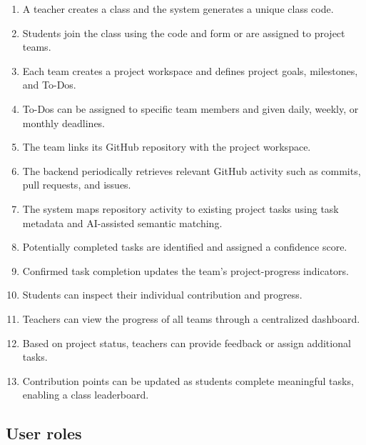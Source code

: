 \documentclass[11pt,a4paper]{article}
\begin{document}
\begin{enumerate}[leftmargin=0.7cm]

    \item A teacher creates a class and the system generates a unique class code.

    \item Students join the class using the code and form or are assigned to project teams.

    \item Each team creates a project workspace and defines project goals, milestones, and To-Dos.

    \item To-Dos can be assigned to specific team members and given daily, weekly, or monthly deadlines.

    \item The team links its GitHub repository with the project workspace.

    \item The backend periodically retrieves relevant GitHub activity such as commits, pull requests, and issues.

    \item The system maps repository activity to existing project tasks using task metadata and AI-assisted semantic matching.

    \item Potentially completed tasks are identified and assigned a confidence score.

    \item Confirmed task completion updates the team's project-progress indicators.

    \item Students can inspect their individual contribution and progress.

    \item Teachers can view the progress of all teams through a centralized dashboard.

    \item Based on project status, teachers can provide feedback or assign additional tasks.

    \item Contribution points can be updated as students complete meaningful tasks, enabling a class leaderboard.

\end{enumerate}


\subsection{User roles}
\end{document}
